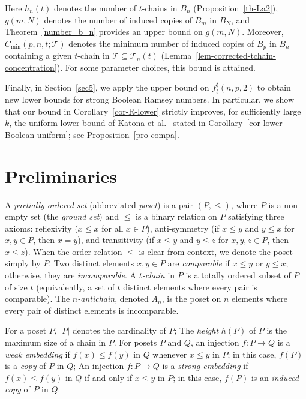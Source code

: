 \documentclass[twoside,12pt]{article}
\begin{document}
Here $h_n(t)$ denotes the number of $t$-chains in $B_n$ (Proposition~\ref{th-La2}), $g(m,N)$ denotes the number of induced copies of $B_m$ in $B_N$, and Theorem~\ref{number_b_n} provides an upper bound on $g(m,N)$. Moreover, \(C_{\min}(p,n,t;\mathcal T)\) denotes the minimum number of induced copies of \(B_p\) in \(B_n\) containing a given \(t\)-chain in \(\mathcal T\subseteq \mathcal T_n(t)\) (Lemma~\ref{lem-corrected-tchain-concentration}). For some parameter choices, this bound is attained.

Finally, in Section~\ref{sec5}, we apply the upper bound on $f_t^{\sharp}(n,p,2)$ to obtain new lower bounds for strong Boolean Ramsey numbers. In particular, we show that our bound in Corollary~\ref{cor-R-lower} strictly improves, for sufficiently large $k$, the uniform lower bound of Katona et al.~\cite{KMOW25} stated in Corollary~\ref{cor-lower-Boolean-uniform}; see Proposition~\ref{pro-compa}.








\section{Preliminaries}

A \emph{partially ordered set} (abbreviated \emph{poset}) is a pair $(P, \leq)$, where $P$ is a non-empty set (the \emph{ground set}) and $\leq$ is a binary relation on $P$ satisfying three axioms: reflexivity ($x \leq x$ for all $x \in P$), anti-symmetry (if $x \leq y$ and $y \leq x$ for $x, y \in P$, then $x = y$), and transitivity (if $x \leq y$ and $y \leq z$ for $x, y, z \in P$, then $x \leq z$).
When the order relation $\leq$ is clear from context, we denote the poset simply by $P$.
Two distinct elements $x, y \in P$ are \emph{comparable} if $x \leq y$ or $y \leq x$; otherwise, they are \emph{incomparable}. A \emph{$t$-chain} in $P$ is a totally ordered subset of $P$ of size $t$ (equivalently, a set of $t$ distinct elements where every pair is comparable).
The \emph{$n$-antichain}, denoted $A_n$, is the poset on $n$ elements where every pair of distinct elements is incomparable.

For a poset $P$, $|P|$ denotes the cardinality of $P$;
The \emph{height} $h(P)$ of $P$ is the maximum size of a chain in $P$.
For posets $P$ and $Q$, an injection $f: P \to Q$ is a \emph{weak embedding} if $f(x) \leq f(y)$ in $Q$ whenever $x \leq y$ in $P$; in this case, $f(P)$ is a \emph{copy} of $P$ in $Q$; An injection $f: P \to Q$ is a \emph{strong embedding} if $f(x) \leq f(y)$ in $Q$ if and only if $x \leq y$ in $P$; in this case, $f(P)$ is an \emph{induced copy} of $P$ in $Q$.
\end{document}

